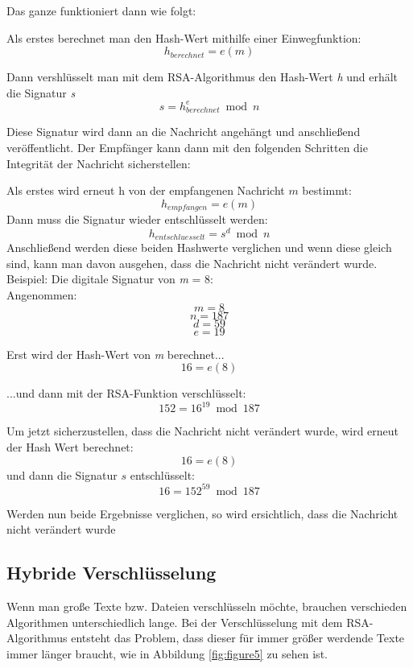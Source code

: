 \documentclass[12pt,a4paper]{scrartcl}
\begin{document}
Das ganze funktioniert dann wie folgt:

Als erstes berechnet man den Hash-Wert mithilfe einer Einwegfunktion:
$$ {h_{berechnet} = e(m)} $$

Dann vershlüsselt man mit dem RSA-Algorithmus den Hash-Wert \textit{h} und erhält die Signatur \textit{s}
$$ {s = h_{berechnet}^e \bmod n} $$

Diese Signatur wird dann an die Nachricht angehängt und anschließend veröffentlicht.
Der Empfänger kann dann mit den folgenden Schritten die Integrität der Nachricht sicherstellen:

Als erstes wird erneut h von der empfangenen Nachricht $m$ bestimmt:
$${h_{empfangen} = e(m) }$$
Dann muss die Signatur wieder entschlüsselt werden:
$$ {h_{entschluesselt} = s^d \bmod n} $$
Anschließend werden diese beiden Hashwerte verglichen und wenn diese gleich sind, kann man davon ausgehen, dass die Nachricht nicht verändert wurde. \\


Beispiel: Die digitale Signatur von \textit{m} = 8:\\ 
Angenommen:
$${ \textit{m} = 8 }$$
$${ \textit{n} = 187 }$$
$${ \textit{d} = 59 }$$
$${ \textit{e} = 19 }$$


Erst wird der Hash-Wert von \textit{m} berechnet...
$$ {16 = e(8)} $$	

...und dann mit der RSA-Funktion verschlüsselt: %
$$ {152 = 16^{19} \bmod 187} $$	

Um jetzt sicherzustellen, dass die Nachricht nicht verändert wurde, wird erneut der Hash Wert berechnet:
$$ {16 = e(8)} $$	
und dann die Signatur $s$ entschlüsselt:
$$ {16 = 152^59 \bmod 187} $$

Werden nun beide Ergebnisse verglichen, so wird ersichtlich, dass die Nachricht nicht verändert wurde

	 	
	\subsection{Hybride Verschlüsselung}
		\label{cha:hybrid}
		
		
		Wenn man große Texte bzw. Dateien verschlüsseln möchte, brauchen verschieden Algorithmen unterschiedlich lange. Bei der Verschlüsselung mit dem RSA-Algorithmus entsteht das Problem, dass dieser für immer größer  werdende Texte immer länger braucht, wie in Abbildung \ref{fig:figure5} zu sehen ist.
\end{document}
